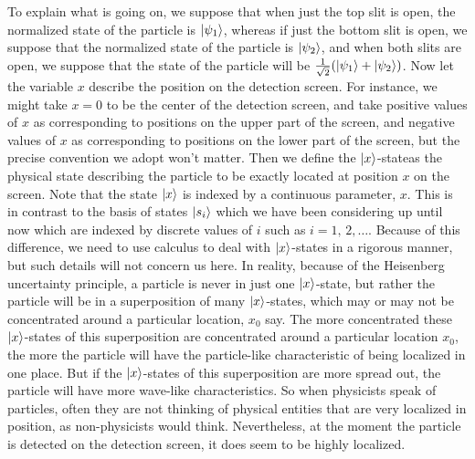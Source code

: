\documentclass[letter, 12pt]{turabian-thesis}
\theoremstyle{hypothesis}
\begin{document}
To explain what is going on, we suppose that when just the top slit is open, the normalized state of the particle is $\ket{\psi_1}$,\label{psi_slit} whereas if just the bottom slit is open, we suppose that the normalized state of the particle is $\ket{\psi_2}$, and when both slits are open, we suppose that the state of the particle will be $\frac{1}{\sqrt{2}}(\ket{\psi_1}+\ket{\psi_2})$. 
 Now let the variable $x$ describe the position on the detection screen. For instance, we might take $x=0$ to be the center of the detection screen, and take  positive values of $x$ as corresponding to positions on the upper part of the screen, and negative values of $x$ as corresponding to positions on the lower part of the screen, but the precise convention we adopt won't matter. Then we define the  $\ket{x}$-state\footnotemark\;as the physical state describing the particle to be exactly located at position $x$ on the screen. Note that the state $\ket{x}$ is indexed by a continuous parameter, $x$. This is in contrast to the basis of states $\ket{s_i}$ which we have been considering up until now which are indexed by discrete values of $i$ such as $i=1,\,2,\ldots.$ Because of this difference, we need to use calculus to deal with $\ket{x}$-states in a rigorous manner, but such details will not concern us here. In reality, because of the Heisenberg uncertainty principle, a particle is never in just one $\ket{x}$-state, but rather the particle will be in a superposition of many $\ket{x}$-states, which may or may not be concentrated around a particular location, $x_0$ say. The more concentrated these  $\ket{x}$-states of this superposition are concentrated around a particular location $x_0$, the more the particle will have the particle-like characteristic of being localized in one place. But if the  $\ket{x}$-states of this superposition are more spread out, the particle will have more wave-like characteristics. So when physicists speak of particles, often they are not thinking of physical entities that are very localized in position, as non-physicists would think. Nevertheless, at the moment the particle is detected on the detection screen, it does seem to be highly localized.
\end{document}
